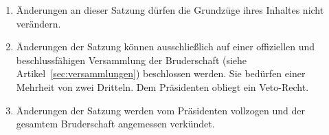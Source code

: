 \documentclass[a4paper,12pt]{scrartcl}
\begin{document}
\begin{enumerate}

\item Änderungen an dieser Satzung dürfen die Grundzüge ihres Inhaltes nicht verändern.

\item Änderungen der Satzung können ausschließlich auf einer offiziellen und beschlussfähigen
  Versammlung der Bruderschaft (siehe Artikel~\ref{sec:versammlungen}) beschlossen werden. Sie
  bedürfen einer Mehrheit von zwei Dritteln. Dem Präsidenten obliegt ein Veto-Recht.

\item Änderungen der Satzung werden vom Präsidenten vollzogen und der gesamtem Bruderschaft
  angemessen verkündet.

\end{enumerate}
\end{document}
